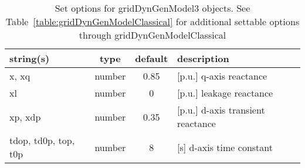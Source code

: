 \begin{table}[ht]
\centering
\begin{tabular}{p{5cm} c c p{7cm}}
\hline
string(s) & type & default & description \\
\hline
x, xq & number & 0.85 & [p.u.] q-axis reactance\\
xl & number & 0 & [p.u.] leakage reactance\\
xp, xdp & number & 0.35 & [p.u.] d-axis transient reactance\\
tdop, td0p, top, t0p & number & 8 & [s]    d-axis time constant\\
\hline
\end{tabular}
\caption{Set options for gridDynGenModel3 objects. See Table~\ref{table:gridDynGenModelClassical} for additional settable options through gridDynGenModelClassical}
\label{table:gridDynGenModel3}
\end{table}
